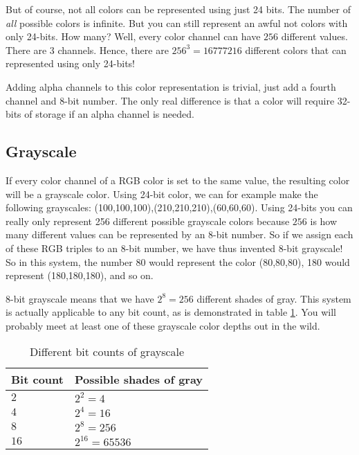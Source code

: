 \begin{refsection}
  But of course, not all colors can be represented using just
  24 bits. The number of \textit{all} possible colors is infinite. But you can still
  represent an awful not colors with only 24-bits. How many? Well, every
  color channel can have $256$ different values. There are $3$
  channels. Hence, there are $256^3 = 16777216$ different colors that
  can represented using only 24-bits!

  \newcommand{\rgbaquad}[4]{
    \mbox{(\textcolor{red}{#1},\textcolor{green}{#2},\textcolor{blue}{#3},\textcolor{gray}{#4})}}

  Adding alpha channels to this color representation is trivial, just
  add a fourth channel and 8-bit number. The only real
  difference is that a color will require 32-bits of storage if an
  alpha channel is needed.

  \subsection{Grayscale}
  \label{sec:other-colors-depths}

  \newcommand{\selfrgbtrip}[3]{\mbox{\textcolor[RGB]{#1,#2,#3}{(#1,#2,#3)}}}
  \newcommand{\selfrgbtripgray}[1]{\selfrgbtrip{#1}{#1}{#1}}

  If every color channel of a RGB color is set to the same value, the
  resulting color will be a grayscale color. Using 24-bit color, we can for example make the following
  grayscales:
  \selfrgbtripgray{100},\selfrgbtripgray{210},\selfrgbtripgray{60}. Using
  24-bits you can really only represent 256 different possible
  grayscale colors because $256$ is how many different values can be
  represented by an 8-bit number. So if we assign each of these RGB
  triples to an 8-bit number, we have thus invented 8-bit
  grayscale! So in this system, the number 80
  would represent the color \selfrgbtripgray{80}, 180 would represent
  \selfrgbtripgray{180}, and so on. \cite{puglia00:_handbook_dig_proj}

  8-bit grayscale means that we have $2^8=256$ different shades of
  gray. This system is actually applicable to any bit count, as is
  demonstrated in table \ref{tab:grayscale}. You will probably meet at least one of
  these grayscale color depths out in the wild.

  \begin{table}[h!]
    \centering
    \begin{tabular}{ll}
      \toprule
      Bit count & Possible shades of gray \\
      \midrule
      $2$ & $2^2 = 4$ \\
      $4$ & $2^4 = 16$ \\
      $8$ & $2^8 = 256$ \\
      $16$ & $2^{16} = 65536$ \\
      \bottomrule
    \end{tabular}
    \caption{Different bit counts of grayscale}
    \label{tab:grayscale}
  \end{table}

  \printbibliography[heading=subbibliography]
\end{refsection}